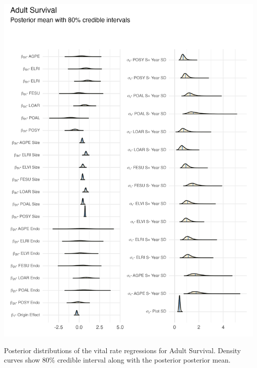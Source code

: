 \documentclass[lineno, sn-basic]{sn-jnl}%
\providecommand{\DIFaddbegin}{} %
\providecommand{\DIFaddend}{} %
\providecommand{\DIFdelend}{} %
\providecommand{\DIFaddbeginFL}{} %
\providecommand{\DIFaddendFL}{} %
\providecommand{\DIFdelbeginFL}{} %
\providecommand{\DIFdelendFL}{} %
\newcommand{\DIFscaledelfig}{0.5}
\newlength{\DIFdelgraphicswidth} %
\newlength{\DIFdelgraphicsheight} %
\newcommand{\DIFaddincludegraphics}[2][]{{\color{blue}\fbox{\DIFOincludegraphics[#1]{#2}}}} %
\newcommand{\DIFdelincludegraphics}[2][]{%
\sbox{\DIFdelgraphicsbox}{\DIFOincludegraphics[#1]{#2}}%
\settoboxwidth{\DIFdelgraphicswidth}{\DIFdelgraphicsbox} %
\settoboxtotalheight{\DIFdelgraphicsheight}{\DIFdelgraphicsbox} %
\scalebox{\DIFscaledelfig}{%
\parbox[b]{\DIFdelgraphicswidth}{\usebox{\DIFdelgraphicsbox}\\[-\baselineskip] \rule{\DIFdelgraphicswidth}{0em}}\llap{\resizebox{\DIFdelgraphicswidth}{\DIFdelgraphicsheight}{%
\setlength{\unitlength}{\DIFdelgraphicswidth}%
\begin{picture}(1,1)%
\thicklines\linethickness{2pt} %
{\color[rgb]{1,0,0}\put(0,0){\framebox(1,1){}}}%
{\color[rgb]{1,0,0}\put(0,0){\line( 1,1){1}}}%
{\color[rgb]{1,0,0}\put(0,1){\line(1,-1){1}}}%
\end{picture}%
}\hspace*{3pt}}} %
} %
\DeclareRobustCommand{\DIFaddbegin}{\DIFOaddbegin \let\includegraphics\DIFaddincludegraphics} %
\DeclareRobustCommand{\DIFaddend}{\DIFOaddend \let\includegraphics\DIFOincludegraphics} %
\DeclareRobustCommand{\DIFdelend}{\DIFOaddend \let\includegraphics\DIFOincludegraphics} %
\DeclareRobustCommand{\DIFaddbeginFL}{\DIFOaddbeginFL \let\includegraphics\DIFaddincludegraphics} %
\DeclareRobustCommand{\DIFaddendFL}{\DIFOaddendFL \let\includegraphics\DIFOincludegraphics} %
\DeclareRobustCommand{\DIFdelbeginFL}{\DIFOdelbeginFL \let\includegraphics\DIFdelincludegraphics} %
\DeclareRobustCommand{\DIFdelendFL}{\DIFOaddendFL \let\includegraphics\DIFOincludegraphics} %
\begin{document}
\begin{myfigure}[H]
	\centering
	\DIFaddendFL \includegraphics[width = \linewidth]{surv_posteriors_plot.png}
	\DIFdelbeginFL %
\DIFdelendFL \DIFaddbeginFL \caption[Posterior distributions of the vital rate regressions for Adult Survival]{\DIFaddendFL Posterior distributions of the vital rate regressions for Adult Survival. Density curves show $80\%$ credible interval along with the posterior posterior mean.}
\DIFdelbeginFL %
\DIFdelend \DIFaddbegin \end{myfigure}
\DIFaddend 
\end{document}
